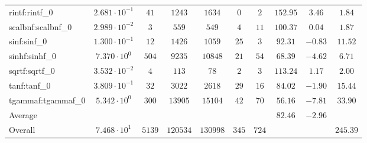 \begin{tabular}{|l|c|c|c|c|c|c|c|c|c|}
rintf:rintf\_0           & $ 2.681 \cdot 10^{-1} $ & $ 41     $ & $ 1243   $ & $ 1634   $ & $ 0   $ & $ 2   $ & $ 152.95      $ & $ 3.46    $ & $ 1.84    $ \\
scalbnf:scalbnf\_0       & $ 2.989 \cdot 10^{-2} $ & $ 3      $ & $ 559    $ & $ 549    $ & $ 4   $ & $ 11  $ & $ 100.37      $ & $ 0.04    $ & $ 1.87    $ \\
sinf:sinf\_0             & $ 1.300 \cdot 10^{-1} $ & $ 12     $ & $ 1426   $ & $ 1059   $ & $ 25  $ & $ 3   $ & $ 92.31       $ & $ -0.83   $ & $ 11.52   $ \\
sinhf:sinhf\_0           & $ 7.370 \cdot 10^{0}  $ & $ 504    $ & $ 9235   $ & $ 10848  $ & $ 21  $ & $ 54  $ & $ 68.39       $ & $ -4.62   $ & $ 6.71    $ \\
sqrtf:sqrtf\_0           & $ 3.532 \cdot 10^{-2} $ & $ 4      $ & $ 113    $ & $ 78     $ & $ 2   $ & $ 3   $ & $ 113.24      $ & $ 1.17    $ & $ 2.00    $ \\
tanf:tanf\_0             & $ 3.809 \cdot 10^{-1} $ & $ 32     $ & $ 3022   $ & $ 2618   $ & $ 29  $ & $ 16  $ & $ 84.02       $ & $ -1.90   $ & $ 15.44   $ \\
tgammaf:tgammaf\_0       & $ 5.342 \cdot 10^{0}  $ & $ 300    $ & $ 13905  $ & $ 15104  $ & $ 42  $ & $ 70  $ & $ 56.16       $ & $ -7.81   $ & $ 33.90   $ \\
\hline
Average                  & $                     $ & $        $ & $        $ & $        $ & $     $ & $     $ & $ 82.46       $ & $ -2.96   $ & $         $ \\
\hline
Overall                  & $ 7.468 \cdot 10^{1}  $ & $ 5139   $ & $ 120534 $ & $ 130998 $ & $ 345 $ & $ 724 $ & $             $ & $         $ & $ 245.39  $ \\
\hline
\end{tabular}
